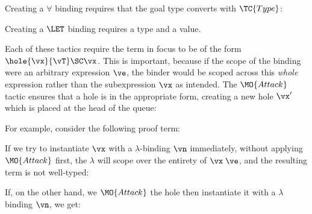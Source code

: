 \noindent
Creating a $\forall$ binding requires that the goal type converts
with $\TC{Type}$:


\noindent
Creating a $\LET$ binding requires a type and a value.


Each of these tactics require the term in focus to be of the form $\hole{\vx}{\vT}\SC\vx$.
This is important, because if the scope of the binding were an arbitrary expression $\ve$,
the binder would be scoped across this \emph{whole} expression rather than the subexpression
$\vx$ as intended.
The $\MO{Attack}$ tactic ensures that a hole
is in the appropriate form, creating a new hole $\vx'$ which is placed at the
head of the queue:


\noindent
For example, consider the following proof term:

\DM{
\hole{\vx}{\va\to\vb}\SC\vx\;\ve
}

\noindent
If we try to instantiate $\vx$ with a $\lambda$-binding $\vn$ immediately,
without applying $\MO{Attack}$ first, the $\lambda$ will scope over the
entirety of $\vx\;\ve$, and the resulting term is not well-typed:

\DM{
\AR{
\lam{\vn}{\va}\SC\hole{\vx}{\vb}\SC\vx\;\ve
}
}

\noindent
If, on the other hand, we $\MO{Attack}$ the hole then instantiate it with
a $\lambda$ binding $\vn$, we get:



